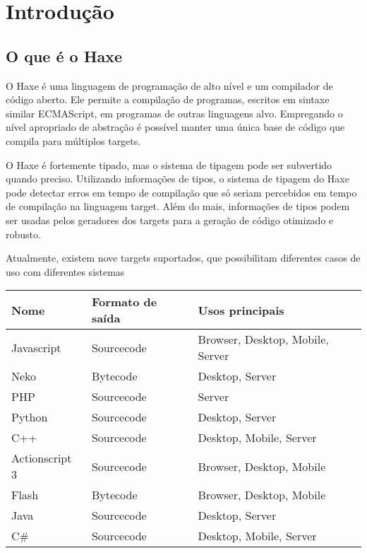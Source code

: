 
\chapter{Introdução}
\label{introduction}

\section{O que é o Haxe}
\label{introduction-what-is-haxe}

O Haxe é uma linguagem de programação de alto nível e um compilador de código aberto. Ele permite a compilação de programas, escritos em sintaxe similar ECMAScript, em programas de outras linguagens alvo. Empregando o nível apropriado de abstração é possível manter uma única base de código que compila para múltiplos targets.

O Haxe é fortemente tipado, mas o sistema de tipagem pode ser subvertido quando preciso. Utilizando informações de tipos, o sistema de tipagem do Haxe pode detectar erros em tempo de compilação que só seriam percebidos em tempo de compilação na linguagem target. Além do mais, informações de tipos podem ser usadas pelos geradores dos targets para a geração de código otimizado e robusto.

Atualmente, existem nove targets suportados, que possibilitam diferentes casos de uso com diferentes sistemas 

\begin{center}
\begin{tabular}{| l | l | l |}
	\hline
	Nome & Formato de saída & Usos principais \\ \hline
	Javascript & Sourcecode & Browser, Desktop, Mobile, Server \\
	Neko & Bytecode & Desktop, Server \\
	PHP & Sourcecode & Server \\
	Python & Sourcecode & Desktop, Server \\
	C++ & Sourcecode & Desktop, Mobile, Server \\
	Actionscript 3 & Sourcecode & Browser, Desktop, Mobile \\
	Flash & Bytecode & Browser, Desktop, Mobile \\ 
	Java & Sourcecode & Desktop, Server \\
	C\# & Sourcecode & Desktop, Mobile, Server \\ \hline
\end{tabular}
\end{center}


